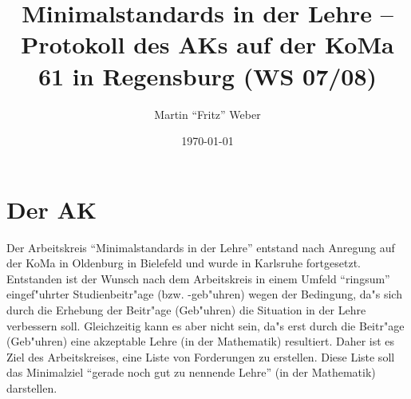\documentclass[oneside,a4paper,pdftex]{article}
\title{Minimalstandards in der Lehre -- Protokoll des AKs auf der KoMa 61 in Regensburg (WS 07/08)}
\author{Martin ``Fritz'' Weber}
\date{\today}
\begin{document}
\maketitle

\section{Der AK}

Der Arbeitskreis "`Minimalstandards in der Lehre"' entstand nach Anregung auf der KoMa
in Oldenburg in Bielefeld und wurde in Karlsruhe fortgesetzt. Entstanden ist der Wunsch
nach dem Arbeitskreis in einem Umfeld "`ringsum"' eingef"uhrter Studienbeitr"age (bzw.
-geb"uhren) wegen der Bedingung, da"s sich durch die Erhebung der Beitr"age (Geb"uhren)
die Situation in der Lehre verbessern soll. Gleichzeitig kann es aber nicht sein, da"s
erst durch die Beitr"age (Geb"uhren) eine akzeptable Lehre (in der Mathematik) resultiert.
Daher ist es Ziel des Arbeitskreises, eine Liste von Forderungen zu erstellen. 
Diese Liste soll das Minimalziel "`gerade noch gut zu nennende Lehre"' (in der Mathematik) 
darstellen.
\end{document}
